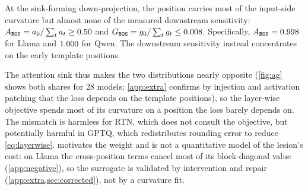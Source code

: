 \begin{proposition}
\label{prop:mismatch}
At the sink-forming down-projection, the \bos{} position carries most of the input-side curvature but almost none of the measured downstream sensitivity: $A_{\texttt{BOS}}=a_0/\sum_t a_t\ge0.50{}$ and $G_{\texttt{BOS}}=g_0/\sum_t g_t\le0.008{}$.
Specifically, $A_{\texttt{BOS}}=0.998{}$ for Llama and $1.000{}$ for Qwen. The downstream sensitivity instead concentrates on the early template
positions.
\end{proposition}
The attention sink thus makes the two distributions nearly opposite (\cref{fig:ag} shows both shares for 28 models; \cref{app:extra} confirms by injection and activation patching that the loss depends on the template positions), so the layer-wise objective spends most of its curvature on a position the loss barely depends on.
The mismatch is harmless for RTN, which does not consult the objective, but potentially harmful in GPTQ, which redistributes rounding error to reduce \cref{eq:layerwise}.
 motivates the weight and is not a quantitative model of the lesion's cost: on Llama the cross-position terms cancel most of its block-diagonal value (\cref{app:negative}), so the surrogate is validated by intervention and repair (\cref{app:extra,sec:corrected}), not by a curvature fit.

